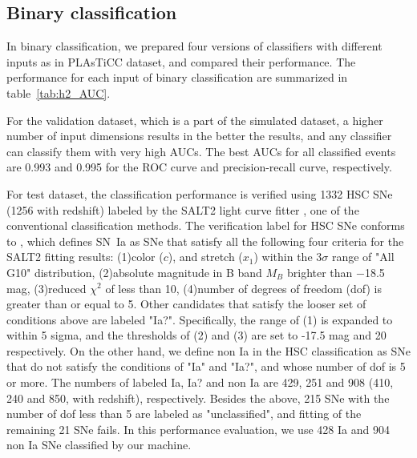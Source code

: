 \documentclass[useamsfonts]{pasj01}
\begin{document}
\subsection{Binary classification}
\label{sec:h2}
%
In binary classification, we prepared four versions of classifiers with different inputs as in PLAsTiCC dataset, and compared their performance.
The performance for each input of binary classification are summarized in table\ \ref{tab:h2_AUC}.

For the validation dataset, which is a part of the simulated dataset, a higher number of input dimensions results in the better the results, and any classifier can classify them with very high AUCs.
The best AUCs for all classified events are 0.993 and 0.995 for the ROC curve and precision-recall curve, respectively.

For test dataset, the classification performance is verified using 1332 HSC SNe (1256 with redshift) labeled by the SALT2 light curve fitter \citep{guy2007,guy10b}, one of the conventional classification methods.
The verification label for HSC SNe conforms to \citet{yasuda19a}, which defines SN~Ia as SNe that satisfy all the following four criteria for the SALT2 fitting results:
(1)color ($c$), and stretch ($x_1$) within the $3\sigma$ range of \citet{scolnickessler2016} "All G10" distribution, 
(2)absolute magnitude in B band $M_B$ brighter than −18.5 mag, 
(3)reduced $\chi ^{2}$ of less than 10,
(4)number of degrees of freedom (dof) is greater than or equal to 5.
Other candidates that satisfy the looser set of conditions above are labeled "Ia?".
Specifically, the range of (1) is expanded to within 5 sigma, and the thresholds of (2) and (3) are set to -17.5 mag and 20 respectively.
On the other hand, we define non Ia in the HSC classification as SNe that do not satisfy the conditions of "Ia" and "Ia?", and whose number of dof is 5 or more.
The numbers of labeled Ia, Ia? and non Ia are 429, 251 and 908 (410, 240 and 850, with redshift), respectively.
Besides the above, 215 SNe with the number of dof less than 5 are labeled as "unclassified", and fitting of the remaining 21 SNe fails.
In this performance evaluation, we use 428 Ia and 904 non Ia SNe classified by our machine.
\end{document}
